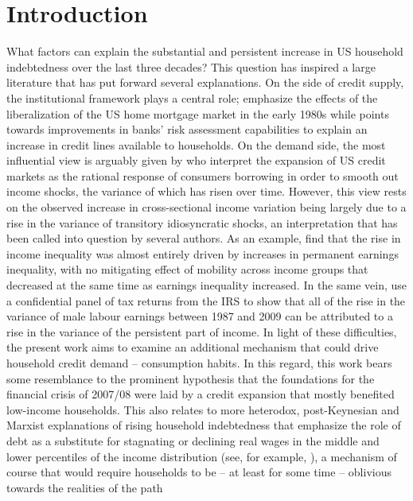 \section{Introduction}\label{sec:intro}
What factors can explain the substantial and persistent increase in US household 
indebtedness over the last three decades? This question has inspired a large 
literature that has put forward several explanations. On the side of credit supply,
 the institutional framework plays a central role; \citet{CampbellHercovitz2005} 
emphasize the effects of the liberalization of the US home mortgage market in the
 early 1980s while \citet{Narajabad2012} points towards improvements in banks' 
risk assessment capabilities to explain an increase in credit lines available to 
households. On the demand side, the most influential view is arguably given by 
\citet{KruegerPerri2006} who interpret the expansion of US credit markets as the 
rational response of consumers borrowing in order to smooth out income shocks, 
the variance of which has risen over time. However, this view rests on the observed
 increase in cross-sectional income variation being largely due to a rise in the 
variance of transitory idiosyncratic shocks, an interpretation that has been called 
into question by several authors. As an example, \citet{KopczukSaezSong2010} find 
that the rise in income inequality was almost entirely driven by increases in 
permanent earnings inequality, with no mitigating effect of mobility across income
 groups that decreased at the same time as earnings inequality increased. In the
 same vein, \citet{DHPRV2013} use a confidential panel of tax returns from the 
IRS to show that all of the rise in the variance of male labour earnings between
1987 and 2009 can be attributed to a rise in the variance of the persistent part 
of income. In light of these difficulties, the present work aims to examine an 
additional mechanism that could drive household credit demand -- consumption 
habits. In this regard, this work bears some resemblance to the prominent
 \citet{Rajan2011} hypothesis that the foundations for the financial crisis of 
2007/08 were laid by a credit expansion that mostly benefited low-income 
households. This also relates to more heterodox, post-Keynesian and Marxist 
explanations of rising household indebtedness that emphasize the role of debt 
as a substitute for stagnating or declining real wages in the middle and lower
 percentiles of the income distribution (see, for example, 
\citealp{BarbaPivetti2009}), a mechanism of course that would require households
 to be -- at least for some time -- oblivious towards the realities of the path

